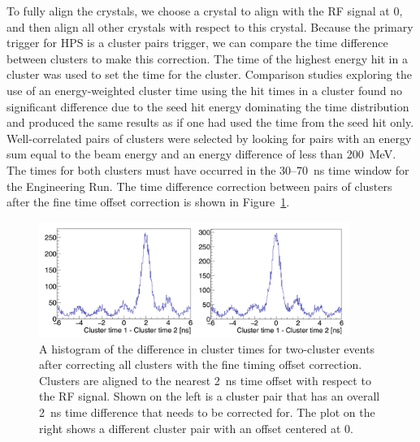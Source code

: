 To fully align the crystals, we choose a crystal to align with the RF signal at 0, and then align all other crystals with respect to this crystal. Because the primary trigger for HPS is a cluster pairs trigger, we can compare the time difference between clusters to make this correction. The time of the highest energy hit in a cluster was used to set the time for the cluster. Comparison studies exploring the use of an energy-weighted cluster time using the hit times in a cluster found no significant difference due to the seed hit energy dominating the time distribution and produced the same results as if one had used the time from the seed hit only. Well-correlated pairs of clusters were selected by looking for pairs with an energy sum equal to the beam energy and an energy difference of less than 200~MeV. The times for both clusters must have occurred in the 30--70~ns time window for the Engineering Run. The time difference correction between pairs of clusters after the fine time offset correction is shown in Figure~\ref{Figure:2clusoffset}.

\begin{figure}[htb]
  \centering
      \includegraphics[width=0.9\textwidth]{pics/performance/2clusteroffset.png}
  \caption[Time difference between two clusters after fine offset time correction]{A histogram of the difference in cluster times for two-cluster events after correcting all clusters with the fine timing offset correction. Clusters are aligned to the nearest 2~ns time offset with respect to the RF signal. Shown on the left is a cluster pair that has an overall 2~ns time difference that needs to be corrected for. The plot on the right shows a different cluster pair with an offset centered at 0.}
  \label{Figure:2clusoffset}
\end{figure}


